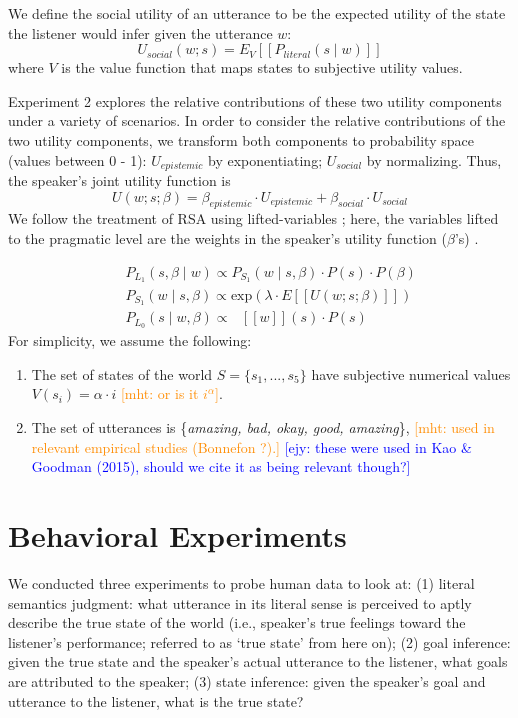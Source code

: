 \documentclass[10pt,letterpaper]{article}
\newcommand{\denote}[1]{\mbox{ $[\![ #1 ]\!]$}}
\newcommand{\mht}[1]{\textcolor{DarkOrange}{[mht: #1]}}
\newcommand{\ejy}[1]{\textcolor{Blue}{[ejy: #1]}}
\begin{document}
We define the social utility of an utterance to be the expected utility of the state the listener would infer given the utterance $w$: 
%
$$
U_{social}(w; s) = E_{V}[[P_{literal}(s \mid w)]]
$$
%
where $V$ is the value function that maps states to subjective utility values. 

Experiment 2 explores the relative contributions of these two utility components under a variety of scenarios. 
In order to consider the relative contributions of the two utility components, we transform both components to probability space (values between 0 - 1): $U_{epistemic}$ by exponentiating; $U_{social}$ by normalizing. Thus, the speaker's joint utility function is
%
$$
U(w;s; \beta) = \beta_{epistemic}\cdot U_{epistemic} + \beta_{social} \cdot U_{social}
$$
%
We follow the treatment of RSA using lifted-variables \cite{GoodmanLassiter2015, Kao2014, Degen2015}; here, the variables lifted to the pragmatic level are the weights in the speaker's utility function ($\beta$'s) .

%
\begin{eqnarray}
&&P_{L_1}(s, \beta \mid w)\propto P_{S_1}(w \mid s, \beta)\cdot P(s) \cdot P(\beta) \label{eq:L1}\\
&&P_{S_1}(w \mid s, \beta) \propto \mathrm{exp}(\lambda \cdot E[[U(w; s; \beta)]])\label{eq:S1}\\
&&P_{L_0}(s \mid w, \beta)\propto \denote{w}(s) \cdot P(s) \label{eq:L0}
\end{eqnarray}
%
For simplicity, we assume the following:
\begin{enumerate}
\item The set of states of the world $S = \{s_{1}, ...,  s_{5}\}$ have subjective numerical values $V(s_{i}) = \alpha \cdot i$ \mht{or is it $i^\alpha$}. 
\item The set of utterances is \{\emph{amazing, bad, okay, good, amazing}\},
  \mht{used in relevant empirical studies (Bonnefon ?).}
   \ejy{these were used in Kao \& Goodman (2015), should we cite it as being relevant though?}
\end{enumerate}



\section{Behavioral Experiments}

We conducted three experiments to probe human data to look at: (1) literal semantics judgment: what utterance in its literal sense is perceived to aptly describe the true state of the world (i.e., speaker's true feelings toward the listener's performance; referred to as `true state' from here on); (2) goal inference: given the true state and the speaker's actual utterance to the listener, what goals are attributed to the speaker; (3) state inference: given the speaker's goal and utterance to the listener, what is the true state?
\end{document}
